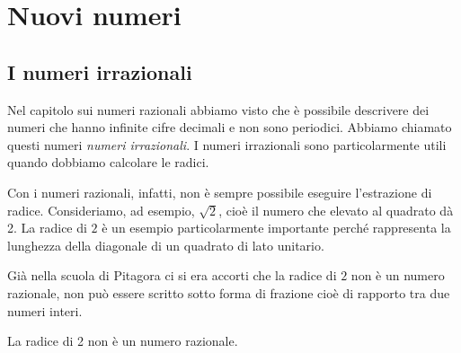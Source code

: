 \section{Nuovi numeri}
\label{sec:radicali_reali}

\subsection{I numeri irrazionali}

Nel capitolo sui numeri razionali abbiamo visto che è possibile descrivere 
dei numeri che hanno infinite cifre decimali e non sono periodici.
Abbiamo chiamato questi numeri \emph{numeri irrazionali}.
I numeri irrazionali sono particolarmente utili quando dobbiamo calcolare 
le radici.

Con i numeri razionali, infatti, non è sempre possibile eseguire 
l'estrazione di radice. 
Consideriamo, ad esempio, \(\sqrt{2}\), cioè il numero che elevato al 
quadrato dà 2. 
La radice di \(2\) è un esempio particolarmente importante perché 
rappresenta la lunghezza della diagonale di un quadrato di lato unitario.


Già nella scuola di Pitagora ci si era accorti che la radice di \(2\) non 
è un numero razionale, non può essere scritto sotto forma di 
frazione cioè di rapporto tra due numeri interi. 

\begin{teorema}{}{}
La radice di 2 non è un numero razionale.
\end{teorema}

